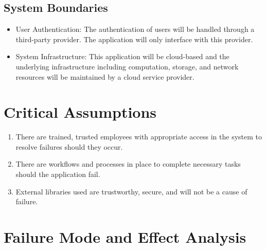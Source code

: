 \documentclass{article}
\begin{document}
\subsection{System Boundaries}
\begin{itemize}
  \item User Authentication: The authentication of users will be handled through
    a third-party provider. The application will only interface with this
    provider.
  \item System Infrastructure: This application will be cloud-based and the
    underlying infrastructure including computation, storage, and network
    resources will be maintained by a cloud service provider.

\end{itemize}
\section{Critical Assumptions}

\begin{enumerate}
  \item There are trained, trusted employees with appropriate access
    in the system to resolve failures should they occur.
  \item There are workflows and processes in place to complete
    necessary tasks should the application fail.
  \item External libraries used are trustworthy, secure, and will not
    be a cause of failure.
\end{enumerate}

\section{Failure Mode and Effect Analysis}
\end{document}
